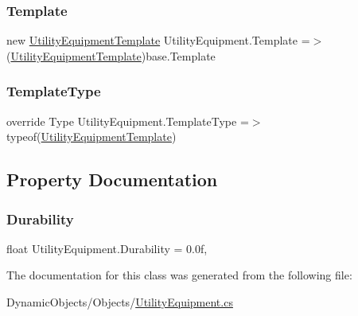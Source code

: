 \subsubsection{\texorpdfstring{Template}{Template}}
{\footnotesize\ttfamily new \mbox{\hyperlink{class_utility_equipment_template}{Utility\+Equipment\+Template}} Utility\+Equipment.\+Template =$>$ (\mbox{\hyperlink{class_utility_equipment_template}{Utility\+Equipment\+Template}})base.\+Template}

\mbox{\label{class_utility_equipment_ae2e6d381a30fd100e5e5a5147fd767ed}} 
\subsubsection{\texorpdfstring{Template\+Type}{TemplateType}}
{\footnotesize\ttfamily override Type Utility\+Equipment.\+Template\+Type =$>$ typeof(\mbox{\hyperlink{class_utility_equipment_template}{Utility\+Equipment\+Template}})\hspace{0.3cm}{\ttfamily [protected]}}



\subsection{Property Documentation}
\mbox{\label{class_utility_equipment_ab8a11f2ff0193732a786c1b18f7ec549}} 
\subsubsection{\texorpdfstring{Durability}{Durability}}
{\footnotesize\ttfamily float Utility\+Equipment.\+Durability = 0.\+0f\hspace{0.3cm}{\ttfamily [get]}, {\ttfamily [set]}}



The documentation for this class was generated from the following file\+:\begin{DoxyCompactItemize}
\item 
Dynamic\+Objects/\+Objects/\mbox{\hyperlink{_utility_equipment_8cs}{Utility\+Equipment.\+cs}}\end{DoxyCompactItemize}
